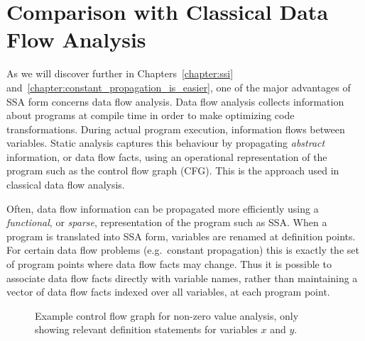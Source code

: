 
\section{Comparison with Classical Data Flow Analysis}
\label{sec:vanilla:dfa}
As we will discover further in Chapters~\ref{chapter:ssi} and~\ref{chapter:constant_propagation_is_easier}, one of the major advantages of SSA form concerns data flow analysis.
Data flow analysis collects information about programs
at compile time
in order to make optimizing code transformations.
During actual program execution, information flows between
variables. Static analysis captures
this behaviour by propagating \textit{abstract} information,
or data flow facts,
using an operational representation of the 
program such as the control flow graph (CFG).
This is the approach used in 
classical data flow analysis.

Often, data flow information can be propagated more efficiently
using a \textit{functional}, or \textit{sparse},
representation of the program such 
as SSA.
When a program is translated into SSA form,
variables are renamed at definition points.
For certain data flow problems (e.g.~constant propagation)
this is exactly the set of program points where data flow
facts may change.
Thus it is possible to associate data flow facts directly with 
variable names, rather than
maintaining a vector of data flow facts indexed over all variables,
at each program point.

\begin{figure}[t]%
%
\caption{Example control flow graph for
  non-zero value analysis, only showing relevant definition statements for
  variables $x$ and $y$.}
\label{fig:part1-vanilla-cfgexample}
\end{figure}


